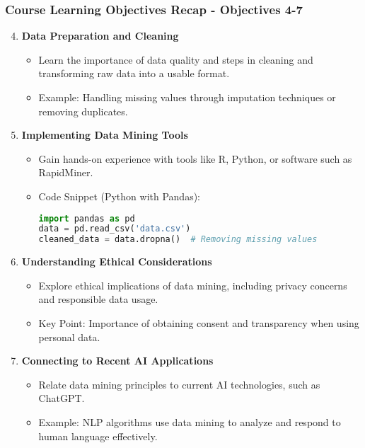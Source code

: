 \documentclass[aspectratio=169]{beamer}
\begin{document}
\begin{frame}[fragile]
    \frametitle{Course Learning Objectives Recap - Objectives 4-7}
    \begin{enumerate}
        \setcounter{enumi}{3} %
        \item \textbf{Data Preparation and Cleaning}
        \begin{itemize}
            \item Learn the importance of data quality and steps in cleaning and transforming raw data into a usable format.
            \item Example: Handling missing values through imputation techniques or removing duplicates.
        \end{itemize}
        \item \textbf{Implementing Data Mining Tools}
        \begin{itemize}
            \item Gain hands-on experience with tools like R, Python, or software such as RapidMiner.
            \item Code Snippet (Python with Pandas):
            \begin{lstlisting}[language=Python]
import pandas as pd
data = pd.read_csv('data.csv')
cleaned_data = data.dropna()  # Removing missing values
            \end{lstlisting}
        \end{itemize}
        \item \textbf{Understanding Ethical Considerations}
        \begin{itemize}
            \item Explore ethical implications of data mining, including privacy concerns and responsible data usage.
            \item Key Point: Importance of obtaining consent and transparency when using personal data.
        \end{itemize}
        \item \textbf{Connecting to Recent AI Applications}
        \begin{itemize}
            \item Relate data mining principles to current AI technologies, such as ChatGPT.
            \item Example: NLP algorithms use data mining to analyze and respond to human language effectively.
        \end{itemize}
    \end{enumerate}
\end{frame}
\end{document}
